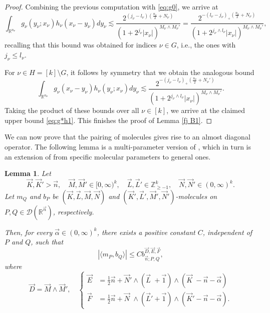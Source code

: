 \documentclass[11pt, reqno]{amsart}
\newtheorem{lemma}[theorem]{Lemma}
\theoremstyle{definition}
\theoremstyle{remark}
\numberwithin{equation}{section}
\newcommand{\vD}{\vec D}
\newcommand{\vE}{\vec E}
\newcommand{\vF}{\vec F}
\newcommand{\R}{\mathbb R}
\newcommand{\Z}{\mathbb Z}
\newcommand{\vone}{\vec 1}
\newcommand{\vn}{\vec n}
\newcommand{\abs}[1]{|#1|}
\begin{document}
\begin{proof}
Combining the previous computation with \eqref{eq:g0}, we arrive at
\begin{equation*}
   \int_{\R^{n_\nu}} g_\nu(y_\nu;x_\nu) h_\nu(x_\nu-y_\nu)dy_\nu
   \lesssim\frac{2^{(j_\nu-l_\nu)(\frac{n_\nu}{2}+N_\nu)}}{(1+2^{j_\nu}\abs{x_\nu})^{M_\nu\wedge M_\nu'}}
   =\frac{2^{-(l_\nu-j_\nu)_+(\frac{n_\nu}{2}+N_\nu)}}{(1+2^{j_\nu\wedge l_\nu}\abs{x_\nu})^{M_\nu\wedge M_\nu'}},
\end{equation*}
recalling that this bound was obtained for indices $\nu\in G$, i.e., the ones with $j_\nu\leq l_\nu$.

For $\nu\in H=[k]\setminus G$, it follows by symmetry that we obtain the analogous bound
\begin{equation*}
   \int_{\R^{n_\nu}} g_\nu(x_\nu-y_\nu) h_\nu(y_\nu;x_\nu)dy_\nu
   \lesssim\frac{2^{-(j_\nu-l_\nu)_+(\frac{n_\nu}{2}+N_\nu')}}{(1+2^{j_\nu\wedge l_\nu}\abs{x_\nu})^{M_\nu\wedge M_\nu'}}.
\end{equation*}
Taking the product of these bounds over all $\nu\in[k]$, we arrive at the claimed upper bound \eqref{eq:g*h1}. This finishes the proof of Lemma \ref{fj B1}.
\end{proof}

We can now prove that the pairing of molecules gives rise to an almost diagonal operator. The following lemma is a multi-parameter version of \cite[Lemma 3.7]{BHYY:1c}, which in turn is an extension of \cite[Corollary B.3]{FJ90} from specific molecular parameters to general ones.

\begin{lemma}\label{like B3}
Let
\begin{equation*}
  \vec K,\vec K'>\vn,\quad
  \vec M,\vec M'\in[0,\infty)^k,\quad
  \vec L,\vec L'\in\Z_{\geq-1}^k,\quad
  \vec N,\vec N'\in(0,\infty)^k.
\end{equation*}
Let $m_Q$ and $b_P$ be $(\vec K,\vec L,\vec M,\vec N)$ and $(\vec K',\vec L',\vec M',\vec N')$-molecules on $P,Q\in\mathscr D(\R^{\vn})$, respectively.

Then, for every $\vec\alpha\in(0,\infty)^k$, there exists a positive constant $C$, independent of $P$ and $Q$, such that
\begin{equation*}
  |\langle m_P,b_Q\rangle|\leq C
  b_{\vn;P,Q}^{\vD,\vE,\vF},
\end{equation*}
where
\begin{equation}\label{eq:B3}
  \vD=\vec M\wedge\vec M',\quad
  \begin{cases}
  \vE &=\frac{1}{2}\vn+\vec N'\wedge(\vec L\phantom{'}+\vone)\wedge(\vec K\phantom{'}-\vn-\vec\alpha) \\
  \vF &=\frac{1}{2}\vn+\vec N\phantom{'}\wedge(\vec L'+\vone)\wedge(\vec K'-\vn-\vec\alpha).
  \end{cases}
\end{equation}
\end{lemma}
\end{document}
